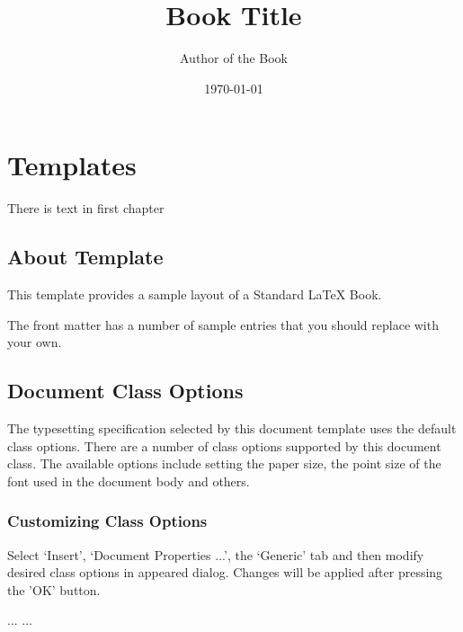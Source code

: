 \documentclass{book}
\begin{document}
\title{\Huge\bf Book Title}
\author{Author of the Book}
\date{\today}
\maketitle

\tableofcontents


\chapter{Templates}
There is text in first chapter

\section{About Template}
This template provides a sample layout of a Standard \LaTeX{} Book.

The front matter has a number of sample entries that you should replace
with your own. 

\section{Document Class Options}
The typesetting specification selected by this document template
uses the default class options. There are a number of class options 
supported by this document class. The available options include 
setting the paper size, the point size of the font used in the 
document body and others.

\subsection{Customizing Class Options}
Select `Insert', `Document Properties ...', the `Generic' tab
and then modify desired class options in appeared dialog.
Changes will be applied after pressing the 'OK' button.



\begin{thebibliography}{99}
 ...
 ...
\end{thebibliography}

\printindex
\end{document}
